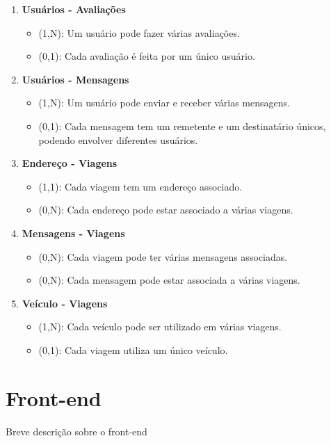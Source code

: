 \begin{enumerate}
	\item \textbf{Usuários - Avaliações}
	\begin{itemize}
		\item (1,N): Um usuário pode fazer várias avaliações.
		\item (0,1): Cada avaliação é feita por um único usuário.
	\end{itemize}
	
	\item \textbf{Usuários - Mensagens}
	\begin{itemize}
		\item (1,N): Um usuário pode enviar e receber várias mensagens.
		\item (0,1): Cada mensagem tem um remetente e um destinatário únicos, podendo envolver diferentes usuários.
	\end{itemize}
	
	\item \textbf{Endereço - Viagens}
	\begin{itemize}
		\item (1,1): Cada viagem tem um endereço associado.
		\item (0,N): Cada endereço pode estar associado a várias viagens.
	\end{itemize}
	
	\item \textbf{Mensagens - Viagens}
	\begin{itemize}
		\item (0,N): Cada viagem pode ter várias mensagens associadas.
		\item (0,N): Cada mensagem pode estar associada a várias viagens.
	\end{itemize}
	
	\item \textbf{Veículo - Viagens}
	\begin{itemize}
		\item (1,N): Cada veículo pode ser utilizado em várias viagens.
		\item (0,1): Cada viagem utiliza um único veículo.
	\end{itemize}
\end{enumerate}









\section{Front-end}
Breve descrição sobre o front-end

